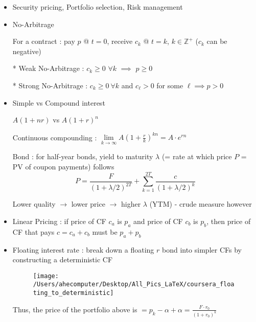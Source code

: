 \documentclass{article}
\begin{document}
\newcommand\independent{\protect\mathpalette{\protect\independenT}{\perp}}
\def\independenT#1#2{\mathrel{\rlap{$#1#2$}\mkern2mu{#1#2}}}



{}
\begin{itemize}
\item Security pricing, Portfolio selection, Risk management

\item {} No-Arbitrage

For a contract : pay $p$ @ $t=0$, receive $c_k$ @ $t=k$, $k \in \mathbb{Z}^{+}$ ($c_k$ can be negative)

* Weak No-Arbitrage : $c_k \geq 0$ $\forall k$ $\implies$ $p \geq 0$

* Strong No-Arbitrage : $c_k \geq 0\ \forall k$ and $c_\ell > 0$ for some $\ell \implies p > 0$

\item Simple vs Compound interest

$A(1 + nr)$ vs $A(1+r)^{n}$

Continuous compounding : $\lim\limits_{k\rightarrow\infty} A(1 + \frac{r}{k})^{kn} = A \cdot e^{rn}$

Bond : for half-year bonds, yield to maturity $\lambda$ (= rate at which price $P$ = PV of coupon payments) follows
$$P = \frac{F}{(1 + \lambda/2)^{2T}} + \sum\limits_{k=1}^{2T} \frac{c}{(1 + \lambda/2)^k}$$

Lower quality $\rightarrow$ lower price $\rightarrow$ higher $\lambda$ (YTM) - crude measure however


\item {} {\color{red} Linear Pricing} : if price of CF $c_a$ is $p_a$ and price of CF $c_b$ is $p_b$, then price of CF that pays $c = c_a + c_b$ must be $p_a + p_b$


\item Floating interest rate : break down a floating $r$ bond into simpler CFs by constructing a deterministic CF

\begin{figure}[h!]
  \texttt{[image: /Users/ahecomputer/Desktop/All\_Pics\_LaTeX/coursera\_floating\_to\_deterministic]}
\end{figure}

Thus, the price of the portfolio above is $= p_k -\alpha + \alpha = \frac{F\cdot r_0}{(1 + r_0)^{k}}$


\end{itemize}
\end{document}
